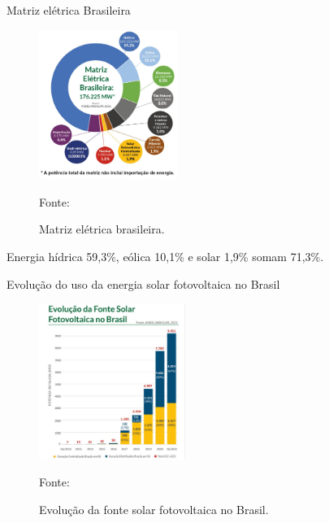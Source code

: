 \documentclass{beamer}
\begin{document}

\begin{frame}{Matriz elétrica Brasileira}

\begin{figure}[H]
    \centering
    \includegraphics[width=0.4\textwidth]{./Figuras/mz_brasil.jpg}
    \caption{Matriz elétrica brasileira.}{Fonte: \cite{ABSOLAR}}
   \label{fig:mz_brasil}
\end{figure}

Energia hídrica 59,3\%, eólica 10,1\% e solar 1,9\% somam 71,3\%.

\end{frame}


\begin{frame}{Evolução do uso da energia solar fotovoltaica no Brasil}

\begin{figure}[H]
    \centering
    \includegraphics[width=0.425\textwidth]{./Figuras/ev_solar.jpg}
    \caption{Evolução da fonte solar fotovoltaica no Brasil.}{Fonte: \cite{ABSOLAR}}
   \label{fig:ev_solar}
\end{figure}

\end{frame}

\end{document}
